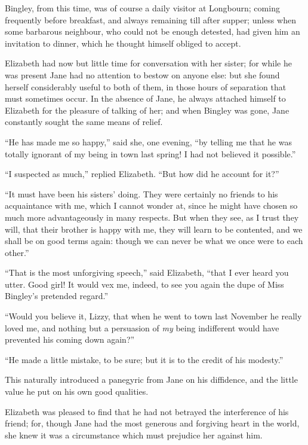 \documentclass[12pt]{book}
\begin{document}
Bingley, from this time, was of course a daily visitor at Longbourn; coming frequently before breakfast, and always remaining till after supper; unless when some barbarous neighbour, who could not be enough detested, had given him an invitation to dinner, which he thought himself obliged to accept.

Elizabeth had now but little time for conversation with her sister; for while he was present Jane had no attention to bestow on anyone else: but she found herself considerably useful to both of them, in those hours of separation that must sometimes occur. In the absence of Jane, he always attached himself to Elizabeth for the pleasure of talking of her; and when Bingley was gone, Jane constantly sought the same means of relief.

``He has made me so happy,'' said she, one evening, ``by telling me that he was totally ignorant of my being in town last spring! I had not believed it possible.''

``I suspected as much,'' replied Elizabeth. ``But how did he account for it?''

``It must have been his sisters' doing. They were certainly no friends to his acquaintance with me, which I cannot wonder at, since he might have chosen so much more advantageously in many respects. But when they see, as I trust they will, that their brother is happy with me, they will learn to be contented, and we shall be on good terms again: though we can never be what we once were to each other.''

``That is the most unforgiving speech,'' said Elizabeth, ``that I ever heard you utter. Good girl! It would vex me, indeed, to see you again the dupe of Miss Bingley's pretended regard.''

``Would you believe it, Lizzy, that when he went to town last November he really loved me, and nothing but a persuasion of \textit{my} being indifferent would have prevented his coming down again?''

``He made a little mistake, to be sure; but it is to the credit of his modesty.''

This naturally introduced a panegyric from Jane on his diffidence, and the little value he put on his own good qualities.

Elizabeth was pleased to find that he had not betrayed the interference of his friend; for, though Jane had the most generous and forgiving heart in the world, she knew it was a circumstance which must prejudice her against him.
\end{document}

